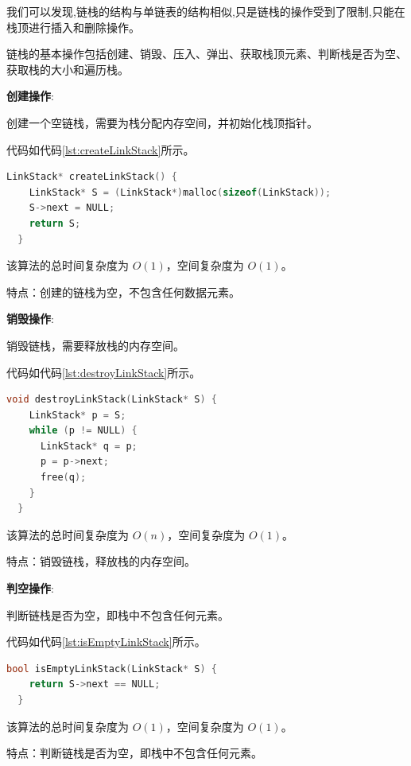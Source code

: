 \documentclass[lang=cn,newtx,10pt,scheme=chinese]{elegantbook}
\begin{document}
我们可以发现,链栈的结构与单链表的结构相似,只是链栈的操作受到了限制,只能在栈顶进行插入和删除操作。

链栈的基本操作包括创建、销毁、压入、弹出、获取栈顶元素、判断栈是否为空、获取栈的大小和遍历栈。

\textbf{创建操作}:

创建一个空链栈，需要为栈分配内存空间，并初始化栈顶指针。

代码如代码\ref{lst:createLinkStack}所示。

\begin{lstlisting}[language=C++, caption={创建一个空链栈示例代码}, label={lst:createLinkStack}]
  LinkStack* createLinkStack() {
    LinkStack* S = (LinkStack*)malloc(sizeof(LinkStack));
    S->next = NULL;
    return S;
  }

\end{lstlisting}

该算法的总时间复杂度为 $O(1)$，空间复杂度为 $O(1)$。

特点：创建的链栈为空，不包含任何数据元素。

\textbf{销毁操作}:

销毁链栈，需要释放栈的内存空间。

代码如代码\ref{lst:destroyLinkStack}所示。

\begin{lstlisting}[language=C++, caption={销毁链栈示例代码}, label={lst:destroyLinkStack}]
  void destroyLinkStack(LinkStack* S) {
    LinkStack* p = S;
    while (p != NULL) {
      LinkStack* q = p;
      p = p->next;
      free(q);
    }
  }

\end{lstlisting}

该算法的总时间复杂度为 $O(n)$，空间复杂度为 $O(1)$。

特点：销毁链栈，释放栈的内存空间。

\textbf{判空操作}:

判断链栈是否为空，即栈中不包含任何元素。

代码如代码\ref{lst:isEmptyLinkStack}所示。

\begin{lstlisting}[language=C++, caption={判断链栈是否为空示例代码}, label={lst:isEmptyLinkStack}]
  bool isEmptyLinkStack(LinkStack* S) {
    return S->next == NULL;
  }

\end{lstlisting}

该算法的总时间复杂度为 $O(1)$，空间复杂度为 $O(1)$。

特点：判断链栈是否为空，即栈中不包含任何元素。
\end{document}
